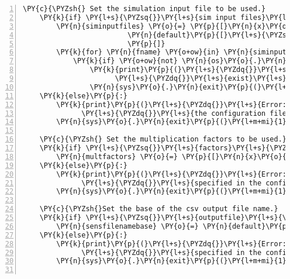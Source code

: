 \begin{Verbatim}[commandchars=\\\{\},fontsize=\small,numbers=left,firstnumber=1,stepnumber=2,firstline=2]
    \PY{c}{\PYZsh{} Set the simulation input file to be used.}
    \PY{k}{if} \PY{l+s}{\PYZsq{}}\PY{l+s}{sim input files}\PY{l+s}{\PYZsq{}} \PY{o+ow}{in} \PY{n}{default}\PY{p}{:}
        \PY{n}{siminputfiles} \PY{o}{=} \PY{p}{[}\PY{n}{x}\PY{o}{.}\PY{n}{strip}\PY{p}{(}\PY{p}{)} \PY{k}{for} \PY{n}{x} \PY{o+ow}{in}
                         \PY{n}{default}\PY{p}{[}\PY{l+s}{\PYZsq{}}\PY{l+s}{sim input files}\PY{l+s}{\PYZsq{}}\PY{p}{]}\PY{o}{.}\PY{n}{split}\PY{p}{(}\PY{l+s}{\PYZsq{}}\PY{l+s}{,}\PY{l+s}{\PYZsq{}}\PY{p}{)}
                         \PY{p}{]}
        \PY{k}{for} \PY{n}{fname} \PY{o+ow}{in} \PY{n}{siminputfiles}\PY{p}{:}
            \PY{k}{if} \PY{o+ow}{not} \PY{n}{os}\PY{o}{.}\PY{n}{path}\PY{o}{.}\PY{n}{isfile}\PY{p}{(}\PY{n}{fname}\PY{p}{)}\PY{p}{:}
                \PY{k}{print}\PY{p}{(}\PY{l+s}{\PYZdq{}}\PY{l+s}{Error: the specified input file \PYZob{}\PYZcb{} does not }\PY{l+s}{\PYZdq{}}
                      \PY{l+s}{\PYZdq{}}\PY{l+s}{exist}\PY{l+s}{\PYZdq{}}\PY{o}{.}\PY{n}{format}\PY{p}{(}\PY{n}{fname}\PY{p}{)}\PY{p}{)}
                \PY{n}{sys}\PY{o}{.}\PY{n}{exit}\PY{p}{(}\PY{l+m+mi}{1}\PY{p}{)}
    \PY{k}{else}\PY{p}{:}
        \PY{k}{print}\PY{p}{(}\PY{l+s}{\PYZdq{}}\PY{l+s}{Error: the simulation input file must be specified in }\PY{l+s}{\PYZdq{}}
              \PY{l+s}{\PYZdq{}}\PY{l+s}{the configuration file}\PY{l+s}{\PYZdq{}}\PY{p}{)}
        \PY{n}{sys}\PY{o}{.}\PY{n}{exit}\PY{p}{(}\PY{l+m+mi}{1}\PY{p}{)}

    \PY{c}{\PYZsh{} Set the multiplication factors to be used.}
    \PY{k}{if} \PY{l+s}{\PYZsq{}}\PY{l+s}{factors}\PY{l+s}{\PYZsq{}} \PY{o+ow}{in} \PY{n}{default}\PY{p}{:}
        \PY{n}{multfactors} \PY{o}{=} \PY{p}{[}\PY{n}{x}\PY{o}{.}\PY{n}{strip} \PY{k}{for} \PY{n}{x} \PY{o+ow}{in} \PY{n}{default}\PY{p}{[}\PY{l+s}{\PYZsq{}}\PY{l+s}{factors}\PY{l+s}{\PYZsq{}}\PY{p}{]}\PY{o}{.}\PY{n}{split}\PY{p}{(}\PY{l+s}{\PYZsq{}}\PY{l+s}{,}\PY{l+s}{\PYZsq{}}\PY{p}{)}\PY{p}{]}
    \PY{k}{else}\PY{p}{:}
        \PY{k}{print}\PY{p}{(}\PY{l+s}{\PYZdq{}}\PY{l+s}{Error: at least one multiplication factor must be }\PY{l+s}{\PYZdq{}}
              \PY{l+s}{\PYZdq{}}\PY{l+s}{specified in the configuration file}\PY{l+s}{\PYZdq{}}\PY{p}{)}
        \PY{n}{sys}\PY{o}{.}\PY{n}{exit}\PY{p}{(}\PY{l+m+mi}{1}\PY{p}{)}

    \PY{c}{\PYZsh{}Set the base of the csv output file name.}
    \PY{k}{if} \PY{l+s}{\PYZsq{}}\PY{l+s}{outputfile}\PY{l+s}{\PYZsq{}} \PY{o+ow}{in} \PY{n}{default}\PY{p}{:}
        \PY{n}{sensfilenamebase} \PY{o}{=} \PY{n}{default}\PY{p}{[}\PY{l+s}{\PYZsq{}}\PY{l+s}{outputfile}\PY{l+s}{\PYZsq{}}\PY{p}{]}
    \PY{k}{else}\PY{p}{:}
        \PY{k}{print}\PY{p}{(}\PY{l+s}{\PYZdq{}}\PY{l+s}{Error: the base of the csv output filename must be }\PY{l+s}{\PYZdq{}}
              \PY{l+s}{\PYZdq{}}\PY{l+s}{specified in the configuration file}\PY{l+s}{\PYZdq{}}\PY{p}{)}
        \PY{n}{sys}\PY{o}{.}\PY{n}{exit}\PY{p}{(}\PY{l+m+mi}{1}\PY{p}{)}


\end{Verbatim}
